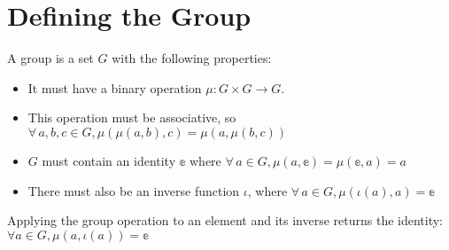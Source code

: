\section{Defining the Group}

\begin{definition}[Group]
    \label{definition : Group}
    \leanok
    A group is a set $G$ with the following properties:
    \begin{itemize}
        \item It must have a binary operation $\mu : G \times G \rightarrow G$.
        \item This operation must be associative, so $\forall \,a, b, c \in G, \mu(\mu(a, b), c) = \mu(a, \mu(b, c))$
        \item $G$ must contain an identity $\mathbb{e}$ where $\forall\,a \in G, \mu (a, \mathbb{e}) = \mu(\mathbb{e}, a) = a$
        \item There must also be an inverse function $\iota$, where $\forall\,a \in G, \mu(\iota(a), a) = \mathbb{e}$
    \end{itemize}
\end{definition}

\begin{theorem}
    \label{theorem : op_inv}
    \leanok
    Applying the group operation to an element and its inverse returns the identity: $\forall a \in G, \mu(a, \iota(a)) = \mathbb{e}$
\end{theorem}
